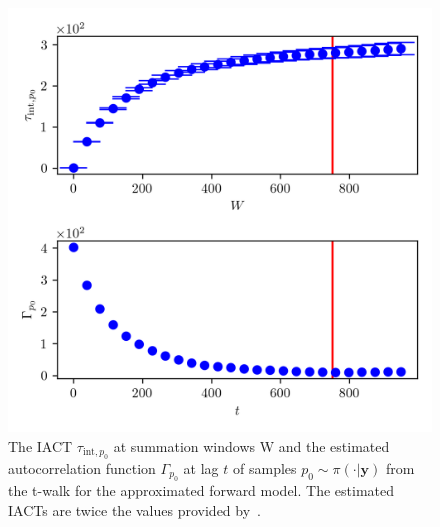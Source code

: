 \begin{figure}[ht!]
	\centering
	\includegraphics{UwerrTauIntTWalk5.png}
	\caption[IACT and autocorrelation function of samples $p_0 \sim \pi(\cdot|\bm{y})$, for approximated model.]{The IACT $\tau_{\text{int},p_0}$ at summation windows W and the estimated autocorrelation function $\Gamma_{p_0}$ at lag $t$ of samples $p_0 \sim \pi( \cdot| \bm{y})$ from the t-walk for the approximated forward model.
	The estimated IACTs are twice the values provided by~\cite{drikHesse, UwerrM}.}
	\label{fig:TWalkIATC6}
\end{figure}


